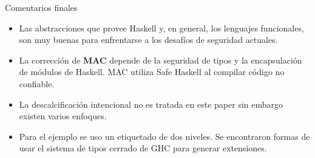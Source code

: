 \documentclass{beamer}
\begin{document}
    


\begin{frame}{Comentarios finales}
    \begin{itemize}
        \item<1-> Las abstracciones que provee Haskell y, en general, los lenguajes funcionales, son muy buenas para enfrentarse a los desafíos de seguridad actuales.

        \item<2-> La corrección de \textbf{MAC} depende de la seguridad de tipos y la encapsulación de módulos de Haskell. MAC utiliza Safe Haskell al compilar código no confiable.
        
        \item<3-> La descalcificación intencional no es tratada en este paper sin embargo existen varios enfoques.
        
        \item<4-> Para el ejemplo se uso un etiquetado de dos niveles. Se encontraron formas de usar el sistema de tipos cerrado de GHC para generar extensiones.
    \end{itemize}
\end{frame}
\end{document}
